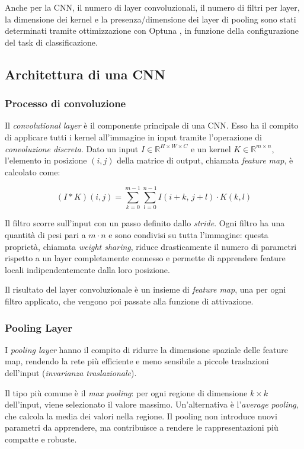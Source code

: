 Anche per la CNN, il numero di layer convoluzionali, il numero di filtri per layer, la dimensione dei kernel e la presenza/dimensione dei layer di pooling sono stati determinati tramite ottimizzazione con Optuna \cite{akiba2019optuna}, in funzione della configurazione del task di classificazione.

\subsection{Architettura di una CNN}

\subsubsection{Processo di convoluzione}

Il \emph{convolutional layer} è il componente principale di una CNN. Esso ha il compito di applicare tutti i kernel all'immagine in input tramite l'operazione di \emph{convoluzione discreta}. Dato un input $I\in\mathbb{R}^{H\times W\times C}$ e un kernel $K\in\mathbb{R}^{m\times n}$, l'elemento in posizione $(i,j)$ della matrice di output, chiamata \emph{feature map}, è calcolato come:

\[
(I * K)(i, j) = \sum_{k=0}^{m-1} \sum_{l=0}^{n-1} I(i+k,\, j+l) \cdot K(k, l)
\]

Il filtro scorre sull'input con un passo definito dallo \emph{stride}. Ogni filtro ha una quantità di pesi pari a $m\cdot n$ e sono condivisi su tutta l'immagine: questa proprietà, chiamata \emph{weight sharing}, riduce drasticamente il numero di parametri rispetto a un layer completamente connesso e permette di apprendere feature locali indipendentemente dalla loro posizione.

Il risultato del layer convoluzionale è un insieme di \emph{feature map}, una per ogni filtro applicato, che vengono poi passate alla funzione di attivazione.

\subsubsection{Pooling Layer}

I \emph{pooling layer} hanno il compito di ridurre la dimensione spaziale delle feature map, rendendo la rete più efficiente e meno sensibile a piccole traslazioni dell'input (\emph{invarianza traslazionale}).

Il tipo più comune è il \emph{max pooling}: per ogni regione di dimensione $k \times k$ dell'input, viene selezionato il valore massimo. Un'alternativa è l'\emph{average pooling}, che calcola la media dei valori nella regione. Il pooling non introduce nuovi parametri da apprendere, ma contribuisce a rendere le rappresentazioni più compatte e robuste.

